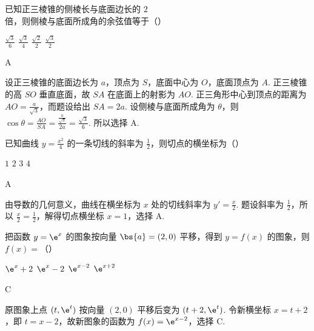\begin{problem}
已知正三棱锥的侧棱长与底面边长的 \(2\) 倍，则侧棱与底面所成角的余弦值等于（\quad）

\choices
    {\(\frac{\sqrt{3}}{6}\)}
    {\(\frac{\sqrt{3}}{4}\)}
    {\(\frac{\sqrt{2}}{2}\)}
    {\(\frac{\sqrt{3}}{2}\)}
\end{problem}

\begin{answer}
A
\end{answer}

\begin{solution}
设正三棱锥的底面边长为 \(a\)，顶点为 \(S\)，底面中心为 \(O\)，底面顶点为 \(A\).
正三棱锥的高 \(SO\) 垂直底面，故 \(SA\) 在底面上的射影为 \(AO\).
正三角形中心到顶点的距离为 \(AO=\frac{a}{\sqrt{3}}\)，而题设给出 \(SA=2a\).
设侧棱与底面所成角为 \(\theta\)，则
\(\cos\theta=\frac{AO}{SA}=\frac{\frac{a}{\sqrt{3}}}{2a}=\frac{\sqrt{3}}{6}\).
所以选择 A.
\end{solution}

\begin{problem}
已知曲线 \(y=\frac{x^2}{4}\) 的一条切线的斜率为 \(\frac{1}{2}\)，则切点的横坐标为（\quad）

\choices
    {\(1\)}
    {\(2\)}
    {\(3\)}
    {\(4\)}
\end{problem}

\begin{answer}
A
\end{answer}

\begin{solution}
由导数的几何意义，曲线在横坐标为 \(x\) 处的切线斜率为
\(y'=\frac{x}{2}\). 题设斜率为 \(\frac12\)，所以
\(\frac{x}{2}=\frac12\)，解得切点横坐标 \(x=1\)，选择 A.
\end{solution}

\begin{problem}
把函数 \(y=\e^x\) 的图象按向量 \(\bs{a}=(2,0)\) 平移，得到 \(y=f(x)\) 的图象，则 \(f(x)=\)（\quad）

\choices
    {\(\e^x+2\)}
    {\(\e^x-2\)}
    {\(\e^{x-2}\)}
    {\(\e^{x+2}\)}
\end{problem}

\begin{answer}
C
\end{answer}

\begin{solution}
原图象上点 \((t,\e^t)\) 按向量 \((2,0)\) 平移后变为
\((t+2,\e^t)\). 令新横坐标 \(x=t+2\)，即 \(t=x-2\)，故新图象的函数为
\(f(x)=\e^{x-2}\)，选择 C.
\end{solution}

